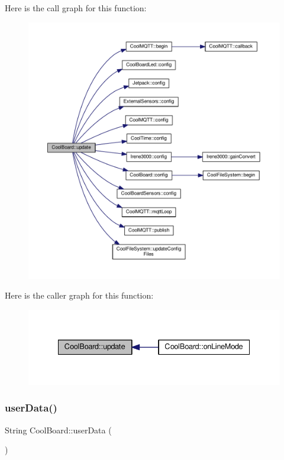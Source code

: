 Here is the call graph for this function\+:
\nopagebreak
\begin{figure}[H]
\begin{center}
\leavevmode
\includegraphics[width=350pt]{classCoolBoard_a8612756d3f73198cdde857a66f0fe690_cgraph}
\end{center}
\end{figure}
Here is the caller graph for this function\+:
\nopagebreak
\begin{figure}[H]
\begin{center}
\leavevmode
\includegraphics[width=335pt]{classCoolBoard_a8612756d3f73198cdde857a66f0fe690_icgraph}
\end{center}
\end{figure}
\mbox{\label{classCoolBoard_ae7358fb6e623cfc81b775f5f1734909b}} 
\subsubsection{\texorpdfstring{user\+Data()}{userData()}}
{\footnotesize\ttfamily String Cool\+Board\+::user\+Data (\begin{DoxyParamCaption}{ }\end{DoxyParamCaption})}

